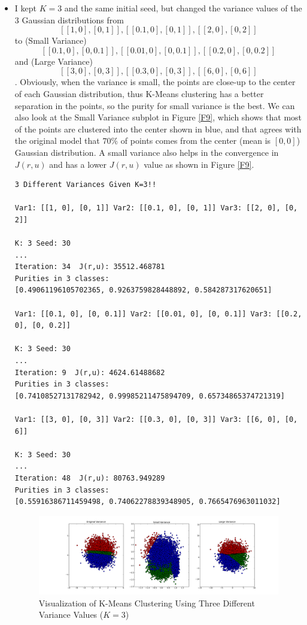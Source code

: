 \begin{itemize}
\item I kept $K=3$ and the same initial seed, but changed the variance values of the $3$ Gaussian distributions from 
\[[[1, 0], [0, 1]], [[0.1, 0], [0, 1]],[[2, 0], [0, 2]]\] 
to (Small Variance) 
\[[[0.1, 0], [0, 0.1]],[[0.01, 0], [0, 0.1]],[[0.2, 0], [0, 0.2]]\]
and (Large Variance)
\[[[3, 0], [0, 3]],[[0.3, 0], [0, 3]],[[6, 0], [0, 6]]\]
. 
Obviously, when the variance is small, the points are close-up to the center of each Gaussian distribution, thus K-Means clustering has a better separation in the points, so the purity for small variance is the best. We can also look at the Small Variance subplot in Figure \ref{F9}, which shows that most of the points are clustered into the center shown in blue, and that agrees with the original model that $70\%$ of points comes from the center (mean is $[0,0]$) Gaussian distribution. A small variance also helps in the convergence in $J(r,u)$ and has a lower $J(r,u)$ value as shown in Figure \ref{F9}. 

\begin{verbatim}
3 Different Variances Given K=3!!

Var1: [[1, 0], [0, 1]] Var2: [[0.1, 0], [0, 1]] Var3: [[2, 0], [0, 2]]

K: 3 Seed: 30
...
Iteration: 34  J(r,u): 35512.468781
Purities in 3 classes: 
[0.49061196105702365, 0.9263759828448892, 0.584287317620651]

Var1: [[0.1, 0], [0, 0.1]] Var2: [[0.01, 0], [0, 0.1]] Var3: [[0.2, 0], [0, 0.2]]

K: 3 Seed: 30
...
Iteration: 9  J(r,u): 4624.61488682
Purities in 3 classes: 
[0.74108527131782942, 0.99985211475894709, 0.65734865374721319]

Var1: [[3, 0], [0, 3]] Var2: [[0.3, 0], [0, 3]] Var3: [[6, 0], [0, 6]]

K: 3 Seed: 30
...
Iteration: 48  J(r,u): 80763.949289
Purities in 3 classes: 
[0.55916386711459498, 0.74062278839348905, 0.7665476963011032]
\end{verbatim}

\begin{figure}[htb]
\centering
\includegraphics[width=18cm]{F8.png}
\caption{Visualization of K-Means Clustering Using Three Different Variance Values ($K=3$)}
\label{F8}
\end{figure}


\end{itemize}

